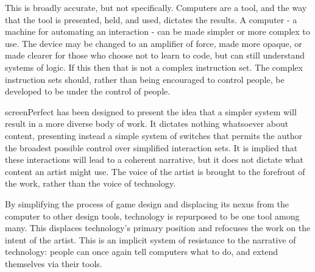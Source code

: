 This is broadly accurate, but not specifically. Computers are a tool, and the way that the tool is presented, held, and used, dictates the results. A computer - a machine for automating an interaction - can be made simpler or more complex to use. The device may be changed to an amplifier of force, made more opaque, or made clearer for those who choose not to learn to code, but can still understand systems of logic. If this then that is not a complex instruction set. The complex instruction sets should, rather than being encouraged to control people, be developed to be under the control of people.

screenPerfect has been designed to present the idea that a simpler system will result in a more diverse body of work. It dictates nothing whatsoever about content, presenting instead a simple system of switches that permits the author the broadest possible control over simplified interaction sets. It is implied that these interactions will lead to a coherent narrative, but it does not dictate what content an artist might use. The voice of the artist is brought to the forefront of the work, rather than the voice of technology.

By simplifying the process of game design and displacing its nexus from the computer to other design tools, technology is repurposed to be one tool among many. This displaces technology's primary position and refocuses the work on the intent of the artist. This is an implicit system of resistance to the narrative of technology: people can once again tell computers what to do, and extend themselves via their tools.

